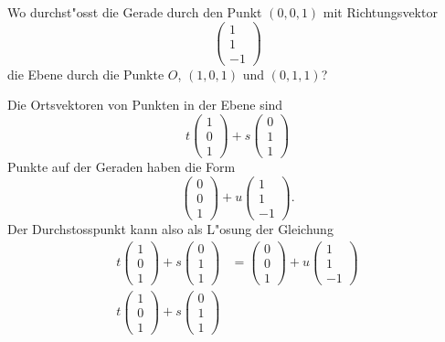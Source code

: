 Wo durchst"osst die Gerade durch den Punkt $(0,0,1)$ mit Richtungsvektor
\[
\begin{pmatrix}1\\1\\-1\end{pmatrix}
\]
die Ebene durch die Punkte $O$, $(1,0,1)$ und $(0,1,1)$?

\begin{loesung}
Die Ortsvektoren von Punkten in der Ebene sind
\[
t
\begin{pmatrix}1\\0\\1\end{pmatrix}
+
s
\begin{pmatrix}0\\1\\1\end{pmatrix}
\]
Punkte auf der Geraden haben die Form
\[
\begin{pmatrix}0\\0\\1\end{pmatrix}+u\begin{pmatrix}1\\1\\-1\end{pmatrix}.
\]
Der Durchstosspunkt kann also als L"osung der Gleichung
\begin{align*}
t\begin{pmatrix}1\\0\\1\end{pmatrix}
+
s\begin{pmatrix}0\\1\\1\end{pmatrix}
&=
\begin{pmatrix}0\\0\\1\end{pmatrix}+u\begin{pmatrix}1\\1\\-1\end{pmatrix}
\\
t\begin{pmatrix}1\\0\\1\end{pmatrix}
+
s\begin{pmatrix}0\\1\\1\end{pmatrix}

\end{align*}
\end{loesung}
